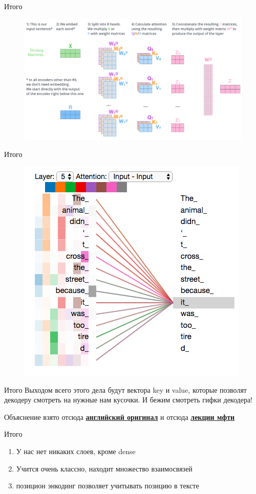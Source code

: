 \documentclass[notes,12pt, aspectratio=169]{beamer}
\begin{document}
\begin{frame}{Итого}
\begin{figure}
	\centering
	\includegraphics[width=0.8\linewidth]{images/final_attention}
	\label{fig:seq2seq}
\end{figure}
\end{frame}

\begin{frame}{Итого}
\begin{figure}
	\centering
	\includegraphics[width=0.5\linewidth]{images/transformer_self-attention_visualization_3}
	\label{fig:seq2seq}
\end{figure}
\end{frame}


\begin{frame}{Итого}
Выходом всего этого дела будут вектора key и value, которые позволят декодеру смотреть на нужные нам кусочки.
И бежим смотреть гифки декодера!

Объяснение взято отсюда \href{http://jalammar.github.io/illustrated-transformer/}{\textbf{английский оригинал}} и отсюда \href{https://www.youtube.com/watch?v=Bg8Y5q1OiP0&list=PL4_hYwCyhAvZeq93ssEUaR47xhvs7IhJM&index=4}{\textbf{лекции мфти}}
\end{frame}

\begin{frame}{Итого}
\begin{enumerate}
	\item У нас нет никаких слоев, кроме dense
	\item Учится очень классно, находит множество взаимосвязей
	\item позицион энкодинг позволяет учитывать позицию в тексте 
\end{enumerate}


\end{frame}
\end{document}
